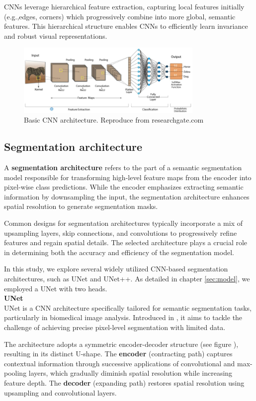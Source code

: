 \documentclass[target=bach,aauheader=,style=]{thud}
\begin{document}
CNNs leverage hierarchical feature extraction, capturing local features initially (e.g.,edges, corners) which progressively combine into more global, semantic features. This hierarchical structure  enables CNNs to efficiently learn invariance and robust visual representations.
\begin{figure}[h]
    \centering
    \includegraphics[width=0.8\textwidth]{imgs/CNN.png}
    \caption{Basic CNN architecture. Reproduce from researchgate.com}
\end{figure}
\subsection{Segmentation architecture}
A \textbf{segmentation architecture} refers to the part of a semantic segmentation model responsible for transforming high-level feature maps from the encoder into pixel-wise class predictions. While the encoder emphasizes extracting semantic information by downsampling the input, the segmentation architecture enhances spatial resolution to generate segmentation masks.

Common designs for segmentation architectures typically incorporate a mix of upsampling layers, skip connections, and convolutions to progressively refine features and regain spatial details. The selected architecture plays a crucial role in determining both the accuracy and efficiency of the segmentation model.

In this study, we explore several widely utilized CNN-based segmentation architectures, such as UNet and UNet++. As detailed in chapter \ref{sec:model}, we employed a UNet with two heads.\\

\noindent\textbf{UNet}\\
\noindent UNet is a CNN architecture specifically tailored for semantic segmentation tasks, particularly in biomedical image analysis. Introduced in \cite{DBLP:journals/corr/RonnebergerFB15}, it aims to tackle the challenge of achieving precise pixel-level segmentation with limited data.

The architecture adopts a symmetric encoder-decoder structure (see figure \cite{fig:unet}), resulting in its distinct U-shape. The \textbf{encoder} (contracting path) captures contextual information through successive applications of convolutional and max-pooling layers, which gradually diminish spatial resolution while increasing feature depth. The \textbf{decoder} (expanding path) restores spatial resolution using upsampling and convolutional layers.
\end{document}
